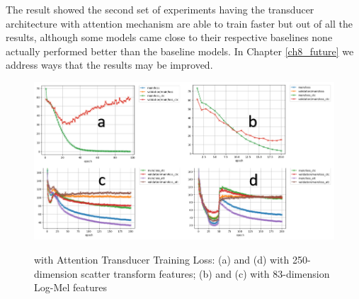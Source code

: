 The result showed the second set of experiments having the transducer architecture with attention mechanism are able to train faster but out of all the results, although some models came close to their respective baselines none actually performed better than the baseline models.  In Chapter \ref{ch8_future} we address ways that the results may be improved.



\begin{figure}
\centering
  \includegraphics[width=14cm]{thesis/images/scatter_res.PNG}\\
  \caption{ with Attention Transducer Training Loss: (a) and (d) with 250-dimension scatter transform features; (b) and (c) with 83-dimension Log-Mel features} \label{fig_6_2_loss}
\end{figure}

